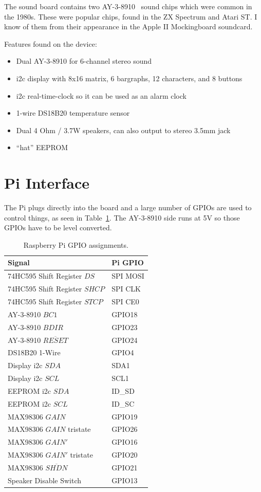 \documentclass[11pt]{article}
\begin{document}
The sound board contains two AY-3-8910~\cite{ay38910} sound chips which
were common in the 1980s.
These were popular chips, found in the ZX Spectrum and Atari ST.
I know of them from their appearance in the Apple II Mockingboard soundcard.

Features found on the device:
\begin{itemize}
\item Dual AY-3-8910 for 6-channel stereo sound
\item i2c display with 8x16 matrix, 6 bargraphs, 12 characters, 
	and 8 buttons
\item i2c real-time-clock so it can be used as an alarm clock
\item 1-wire DS18B20 temperature sensor
\item Dual 4 Ohm / 3.7W speakers, can also output to stereo 3.5mm jack
\item ``hat'' EEPROM 
\end{itemize}

\section{Pi Interface}

The Pi plugs directly into the board and a large number of GPIOs are
used to control things, as seen in Table~\ref{table:gpio}.
The AY-3-8910 side runs at 5V so those GPIOs have to be level converted.

\begin{table}[tbh]
\caption{Raspberry Pi GPIO assignments.\label{table:gpio}}
\centering
\begin{tabular}{|l|l|}
\hline
Signal	&	Pi GPIO \\
\hline
\hline
74HC595 Shift Register $DS$	&	SPI MOSI \\
74HC595 Shift Register $SHCP$	&	SPI CLK\\
74HC595 Shift Register $STCP$	& 	SPI CE0\\
\hline
AY-3-8910 $BC1$			&	GPIO18 \\
AY-3-8910 $BDIR$		&	GPIO23 \\
AY-3-8910 $\overline{RESET}$	&	GPIO24 \\
\hline
DS18B20 1-Wire			&	GPIO4\\
\hline
Display i2c $SDA$		&	SDA1	\\
Display i2c $SCL$		&	SCL1	\\
\hline
EEPROM i2c $SDA$		&	ID\_SD	\\
EEPROM i2c $SCL$		&	ID\_SC	\\
\hline
MAX98306 $GAIN$			&	GPIO19 \\
MAX98306 $GAIN$ tristate	&	GPIO26 \\
MAX98306 $GAIN'$		&	GPIO16 \\
MAX98306 $GAIN'$ tristate	&	GPIO20 \\
MAX98306 $\overline{SHDN}$	&	GPIO21 \\
Speaker Disable Switch		&	GPIO13 \\
\hline
\end{tabular}
\end{table}
\end{document}
